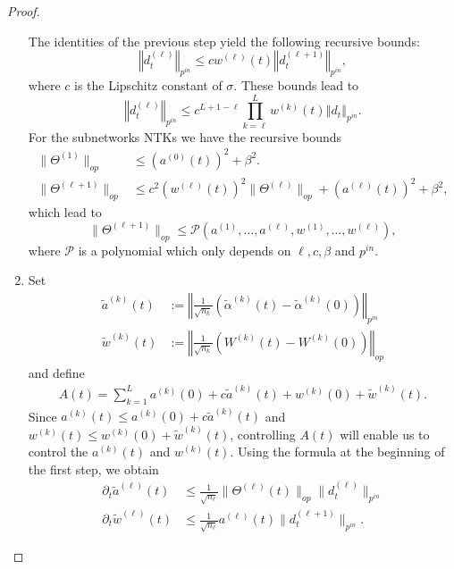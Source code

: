 \documentclass{article}
\begin{document}
\begin{proof}
\begin{enumerate}
The identities of the previous step yield the following recursive bounds:
\[
\left\Vert d_{t}^{(\ell)}\right\Vert _{p^{in}}\le c w^{(\ell)}(t)\left\Vert d_{t}^{(\ell+1)}\right\Vert _{p^{in}},
\]
where $c$ is the Lipschitz constant of $\sigma$. These bounds lead to
\[
\left\Vert d_{t}^{(\ell)}\right\Vert _{p^{in}}\leq c^{L+1-\ell}\prod_{k=\ell}^{L}w^{(k)}(t)\left\Vert d_{t}\right\Vert _{p^{in}}.
\]
For the subnetworks NTKs we have the recursive bounds
\begin{align*}
\|\Theta^{(1)}\|_{op} & \le(a^{(0)}(t))^{2}+\beta^{2}.\\
\|\Theta^{(\ell+1)}\|_{op} & \le c^{2} (w^{(\ell)}(t) )^2
\| \Theta^{(\ell)} \|_{op}+(a^{(\ell)}(t))^{2}+\beta^{2},
\end{align*}
which lead to 
\[
\|\Theta^{(\ell+1)}\|_{op}\leq\mathcal{P}\left(a^{(1)},\ldots,a^{(\ell)},w^{(1)},\ldots,w^{(\ell)}\right),
\]
where $ \mathcal P $ is a polynomial which only depends on $ \ell, c, \beta $ and $ p^{in} $.
\item Set 
\begin{align*}
\tilde{a}^{(k)}\left(t\right) & :=\left\Vert \frac{1}{\sqrt{n_{k}}}\left(\tilde{\alpha}^{\left(k\right)}\left(t\right)-\tilde{\alpha}^{\left(k\right)}\left(0\right)\right)\right\Vert _{p^{in}}\\
\tilde{w}^{(k)}\left(t\right) & :=\left\Vert \frac{1}{\sqrt{n_{k}}}\left(W^{\left(k\right)}\left(t\right)-W^{\left(k\right)}\left(0\right)\right)\right\Vert _{op}
\end{align*}
 and define 
\begin{align*}
A\left(t\right)=\sum_{k=1}^{L}a^{\left(k\right)}\left(0\right)+c\tilde{a}^{\left(k\right)}\left(t\right)+w^{\left(k\right)}\left(0\right)+\tilde{w}^{\left(k\right)}\left(t\right).
\end{align*}
Since $a^{\left(k\right)}\left(t\right)\leq a^{\left(k\right)}\left(0\right)+c\tilde{a}^{\left(k\right)}\left(t\right)$
and $w^{\left(k\right)}\left(t\right)\leq w^{\left(k\right)}\left(0\right)+\tilde{w}^{\left(k\right)}\left(t\right)$,
controlling $A\left(t\right)$ will enable us to control the $a^{\left(k\right)}\left(t\right)$
and $w^{\left(k\right)}\left(t\right)$. Using the formula at the
beginning of the first step, we obtain
\begin{align*}
\partial_{t}\tilde{a}^{\left(\ell\right)}\left(t\right) & \le\frac{1}{\sqrt{n_{\ell}}}\|\Theta^{(\ell)}(t)\|_{op}\|d_{t}^{(\ell)}\|_{p^{in}}\\
\partial_{t}\tilde{w}^{\left(\ell\right)}\left(t\right) & \le\frac{1}{\sqrt{n_{\ell}}}a^{\left(\ell\right)}\left(t\right)\|d_{t}^{(\ell+1)}\|_{p^{in}}.

\end{align*}
\end{enumerate}
\end{proof}
\end{document}
